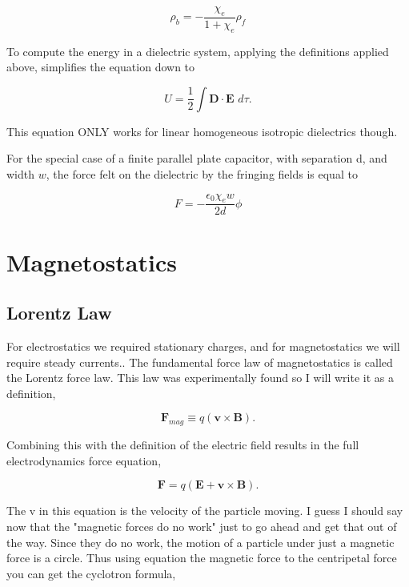 \documentclass[preprint, review,12pt]{elsarticle}
\def\x{\times}
\def\.{\cdot}
\def\b{\textbf}
\def\={\equiv}
\begin{document}
\begin{equation}
    \rho_b = - \frac{\chi_e}{1+\chi_e}\rho_f
\end{equation}

To compute the energy in a dielectric system, applying the definitions applied above, simplifies the equation down to

\begin{equation}
    U = \frac{1}{2}\int \b{D}\. \b{E} \hspace{4pt} d\tau.
\end{equation}

This equation ONLY works for linear homogeneous isotropic dielectrics though.

For the special case of a finite parallel plate capacitor, with separation d, and width $w$, the force felt on the dielectric by the fringing fields is equal to 

\begin{equation}
    F = -\frac{\epsilon_0\chi_ew}{2d}\phi
\end{equation}

\section{Magnetostatics}

\subsection{Lorentz Law}

For electrostatics we required stationary charges, and for magnetostatics we will require steady currents.. The fundamental force law of magnetostatics is called the Lorentz force law. This law was experimentally found so I will write it as a definition,

\begin{equation}
    \b{F}_{mag} \= q(\b{v} \x \b{B}).
\end{equation}

Combining this with the definition of the electric field results in the full electrodynamics force equation,

\begin{equation}
    \b{F} = q(\b{E} + \b{v} \x \b{B}).
\end{equation}

The v in this equation is the velocity of the particle moving. I guess I should say now that the "magnetic forces do no work" just to go ahead and get that out of the way. Since they do no work, the motion of a particle under just a magnetic force is a circle. Thus using equation the magnetic force to the centripetal force you can get the cyclotron formula,
\end{document}
